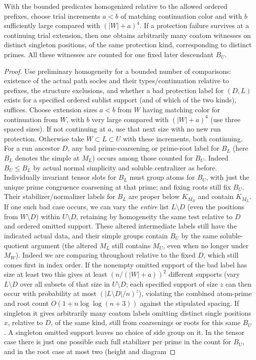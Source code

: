 \begin{lemma}
\label{fb:protection-count}
With the bounded predicates homogenized relative to the allowed ordered
prefixes, choose trial increments \(a<b\) of matching continuation color and
with \(b\) sufficiently large compared with \((|W|+a)^4\).  If a protection
failure survives at a continuing trial extension, then one obtains arbitrarily
many coatom witnesses on distinct singleton positions, of the same protection
kind, corresponding to distinct primes.  All these witnesses are counted for
one fixed later descendant \(B_U\).
\end{lemma}
\begin{proof}

Use preliminary homogeneity for a bounded number of comparisons: existence of the actual path socles and their types/continuation relative to prefixes, the structure exclusions, and whether a bad protection label for \((D,L)\) exists for a specified ordered sublist support (and of which of the two kinds), suffices. Choose extension sizes \(a<b\) from \(W\) having matching color for continuation from \(W\), with \(b\) very large compared with \((|W|+a)^4\) (use three spaced sizes). If not continuing at \(a\), use that next size with no new run protection. Otherwise take \(W\subset L\subset U\) with these increments, both continuing. For a run ancestor \(D\), any bad prime-coarsening or prime-root label for \(B_L\) (here \(B_L\) denotes the simple at \(M_L\)) occurs among those counted for \(B_U\). Indeed \(B_U\le B_L\) by actual normal simplicity and soluble centralizer as before. Individually invariant tensor slots for \(B_L\) must group atoms for \(B_U\), with just the unique prime congruence coarsening at that prime; and fixing roots still fix \(B_U\). Their stabilizer/normalizer labels for \(B_L\) are proper below \(K_{M_D}\) and contain \(K_{M_L}\). If one such bad case occurs, we can vary the \emph{entire} list \(L\setminus D\) (even the positions from \(W\setminus D\)) within \(U\setminus D\), retaining by homogeneity the same test relative to \(D\) and ordered omitted support. These altered intermediate labels still have the indicated actual data, and their simple groups contain \(B_U\) by the same soluble-quotient argument (the altered \(M_L\) still contains \(M_U\), even when no longer under \(M_W\)). Indeed we are comparing throughout relative to the fixed \(D\), which still comes first in index order. If the nonempty omitted support of the bad label has size at least two this gives at least \((n/(|W|+a))^2\) different supports (vary \(L\setminus D\) over all subsets of that size in \(U\setminus D\); each specified support of size \(z\) can then occur with probability at most \((|L\setminus D|/n)^z\)), violating the combined atom-prime and root count \(O(1+n\log\log(n+3))\) against the stipulated spacing. If singleton it gives arbitrarily many coatom labels omitting distinct single positions \(x\), relative to \(D\), of the same kind, still from coarsenings or roots for this same \(B_U\). A singleton omitted support leaves no choice of side group on it. In the tensor case there is just one possible such full stabilizer per prime in the count for \(B_U\), and in the root case at most two (height and diagram 
\end{proof}
